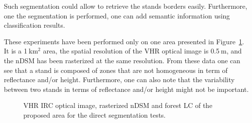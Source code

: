Such segmentation could allow to retrieve the stands borders easily. Furthermore, one the segmentation is performed, one can add semantic information using classification results.

These experiments have been performed only on one area presented in Figure~\ref{fig:data_direct_seg}. It is a 1$\:$km$^{2}$ area, the spatial resolution of the VHR optical image is 0.5$\:$m, and the nDSM has been rasterized at the same resolution. From these data one can see that a stand is composed of zones that are not homogeneous in term of reflectance and/or height. Furthermore, one can also note that the variability between two stands in terms of reflectance and/or height might not be important.

\begin{figure}[htbp]
\begin{center}
\begingroup
\captionsetup[subfigure]{width=0.16\textwidth}
\endgroup
\caption{VHR IRC optical image, rasterized nDSM and forest LC of the proposed area for the direct segmentation tests.}
\label{fig:data_direct_seg}
\end{center}
\end{figure}

